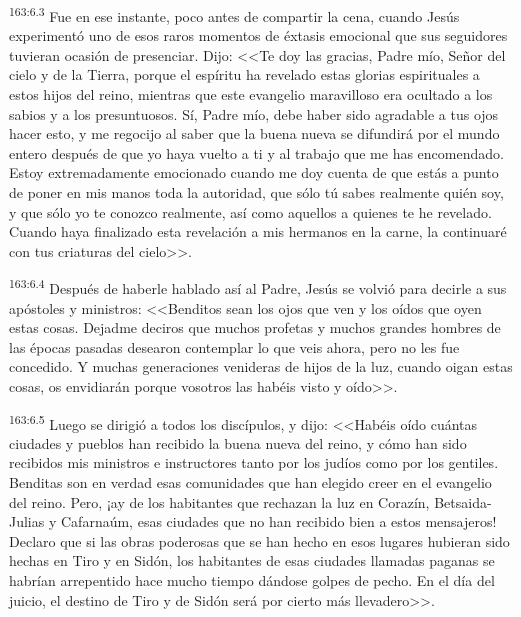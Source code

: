 \par 
\textsuperscript{163:6.3} Fue en ese instante, poco antes de compartir la cena, cuando Jesús experimentó uno de esos raros momentos de éxtasis emocional que sus seguidores tuvieran ocasión de presenciar. Dijo: <<Te doy las gracias, Padre mío, Señor del cielo y de la Tierra, porque el espíritu ha revelado estas glorias espirituales a estos hijos del reino, mientras que este evangelio maravilloso era ocultado a los sabios y a los presuntuosos. Sí, Padre mío, debe haber sido agradable a tus ojos hacer esto, y me regocijo al saber que la buena nueva se difundirá por el mundo entero después de que yo haya vuelto a ti y al trabajo que me has encomendado. Estoy extremadamente emocionado cuando me doy cuenta de que estás a punto de poner en mis manos toda la autoridad, que sólo tú sabes realmente quién soy, y que sólo yo te conozco realmente, así como aquellos a quienes te he revelado. Cuando haya finalizado esta revelación a mis hermanos en la carne, la continuaré con tus criaturas del cielo>>.

\par 
\textsuperscript{163:6.4} Después de haberle hablado así al Padre, Jesús se volvió para decirle a sus apóstoles y ministros: <<Benditos sean los ojos que ven y los oídos que oyen estas cosas. Dejadme deciros que muchos profetas y muchos grandes hombres de las épocas pasadas desearon contemplar lo que veis ahora, pero no les fue concedido. Y muchas generaciones venideras de hijos de la luz, cuando oigan estas cosas, os envidiarán porque vosotros las habéis visto y oído>>.

\par 
\textsuperscript{163:6.5} Luego se dirigió a todos los discípulos, y dijo: <<Habéis oído cuántas ciudades y pueblos han recibido la buena nueva del reino, y cómo han sido recibidos mis ministros e instructores tanto por los judíos como por los gentiles. Benditas son en verdad esas comunidades que han elegido creer en el evangelio del reino. Pero, ¡ay de los habitantes que rechazan la luz en Corazín, Betsaida-Julias y Cafarnaúm, esas ciudades que no han recibido bien a estos mensajeros! Declaro que si las obras poderosas que se han hecho en esos lugares hubieran sido hechas en Tiro y en Sidón, los habitantes de esas ciudades llamadas paganas se habrían arrepentido hace mucho tiempo dándose golpes de pecho. En el día del juicio, el destino de Tiro y de Sidón será por cierto más llevadero>>.

